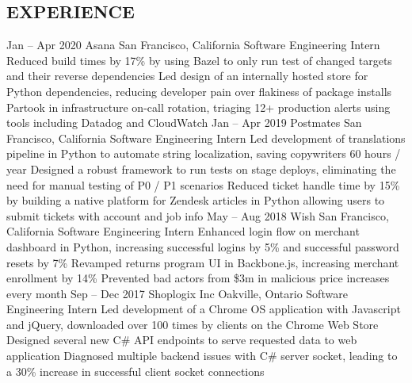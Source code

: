 \documentclass{aanguyen_res}
\begin{document}
  \begin{main}
    \vspace{0.2cm}%
    \section{EXPERIENCE}
      \begin{entrylist}
        \rightentry%
          {Jan -- Apr 2020}%
          {Asana}%
          {San Francisco, California}%
          {Software Engineering Intern}%
          {\createlist%
            {%
              Reduced build times by 17\%  by using Bazel to only run test of changed targets %
              and their reverse dependencies %
            }%
            {%
              Led design of an internally hosted store for Python dependencies, reducing developer %
              pain over flakiness of package installs %
            }%
            {%
              Partook in infrastructure on-call rotation, triaging 12+ production alerts using tools %
              including Datadog and CloudWatch %
            }%
          }
        \rightentry%
          {Jan -- Apr 2019}%
          {Postmates}%
          {San Francisco, California}%
          {Software Engineering Intern}%
          {\createlist%
            {%
              Led development of translations pipeline in Python to automate string localization, %
              saving copywriters 60 hours / year %
            }%
            {%
              Designed a robust framework to run tests on stage deploys, eliminating the need for %
              manual testing of P0 / P1 scenarios %
            }%
            {%
              Reduced ticket handle time by 15\% by building a native platform for Zendesk articles %
              in Python allowing users to submit tickets with account and job info %
            }%
          }
        \rightentry%
          {May -- Aug 2018}%
          {Wish}%
          {San Francisco, California}%
          {Software Engineering Intern}%
          {\createlist%
            {%
              Enhanced login flow on merchant dashboard in Python, increasing successful logins %
              by 5\% and successful password resets by 7\% %
            }%
            {%
              Revamped returns program UI in Backbone.js, increasing merchant enrollment %
              by 14\% %
            }%
            {%
              Prevented bad actors from \$3m in malicious price increases every month %
            }%
          }
        \rightentry%
          {Sep -- Dec 2017}%
          {Shoplogix Inc}%
          {Oakville, Ontario}%
          {Software Engineering Intern}%
          {\createlist%
            {%
              Led development of a Chrome OS application with Javascript and jQuery, downloaded %
              over 100 times by clients on the Chrome Web Store %
            }%
            {%
              Designed several new C\# API endpoints to serve requested data to web application %
            }%
            {%
              Diagnosed multiple backend issues with C\# server socket, leading to a 30\% increase %
              in successful client socket connections %
            }%
          }
      \end{entrylist}

\end{main}
\end{document}
